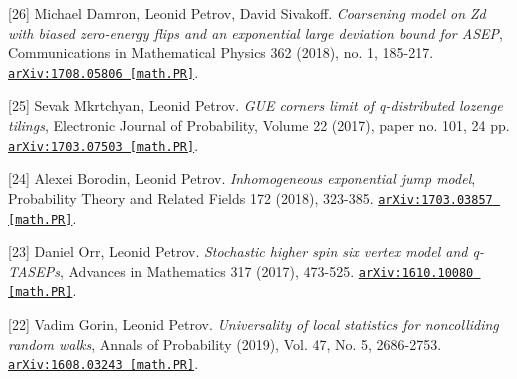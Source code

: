 \begin{etaremune}
\item[{[26]}] 
Michael Damron, Leonid Petrov, David Sivakoff.
\emph{Coarsening model on Zd with biased zero-energy flips and an exponential large deviation bound for ASEP}, Communications in Mathematical Physics 362 (2018), no. 1, 185-217. 
\href{https://arxiv.org/abs/1708.05806}{\texttt{arXiv:1708.05806 [math.PR]}}.

















\item[{[25]}] 
Sevak Mkrtchyan, Leonid Petrov.
\emph{GUE corners limit of q-distributed lozenge tilings}, Electronic Journal of Probability, Volume 22 (2017), paper no. 101, 24 pp. 
\href{https://arxiv.org/abs/1703.07503}{\texttt{arXiv:1703.07503 [math.PR]}}.



\item[{[24]}] 
Alexei Borodin, Leonid Petrov.
\emph{Inhomogeneous exponential jump model}, Probability Theory and Related Fields 172 (2018), 323-385. 
\href{https://arxiv.org/abs/1703.03857}{\texttt{arXiv:1703.03857 [math.PR]}}.

















\item[{[23]}] 
Daniel Orr, Leonid Petrov.
\emph{Stochastic higher spin six vertex model and q-TASEPs}, Advances in Mathematics 317 (2017), 473-525. 
\href{https://arxiv.org/abs/1610.10080}{\texttt{arXiv:1610.10080 [math.PR]}}.









\item[{[22]}] 
Vadim Gorin, Leonid Petrov.
\emph{Universality of local statistics for noncolliding random walks}, Annals of Probability (2019), Vol. 47, No. 5, 2686-2753. 
\href{https://arxiv.org/abs/1608.03243}{\texttt{arXiv:1608.03243 [math.PR]}}.




\end{etaremune}
